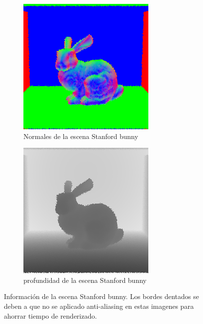 \documentclass{article}
\begin{document}
\begin{figure}[H]
  \begin{subfigure}[h]{0.4\linewidth}
    \includegraphics[width=\linewidth]{imgs/normal.png}
    \caption{Normales de la escena Stanford bunny}
  \end{subfigure}
  \hfill
  \begin{subfigure}[h]{0.4\linewidth}
    \includegraphics[width=\linewidth]{imgs/depth.png}
    \caption{profundidad de la escena Stanford bunny}
  \end{subfigure}
  \caption{Información de la escena Stanford bunny. Los bordes dentados se deben
    a que no se aplicado anti-aliasing en estas imagenes para ahorrar tiempo de
    renderizado.}
\end{figure}
\end{document}

